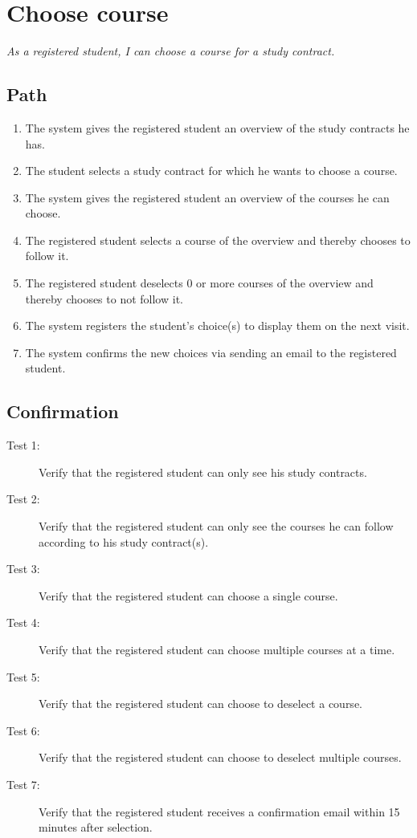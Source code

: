 \section{Choose course}

\par \emph{As a registered student, I can choose a course for a study contract.}

\subsection{Path}

\begin{enumerate}
  \item The system gives the registered student an overview of the study
  contracts he has.
  \item The student selects a study contract for which he wants to choose a
  course.
  \item The system gives the registered student an overview of the courses he
  can choose.
  \item The registered student selects a course of the overview and thereby
  chooses to follow it.
  \item The registered student deselects 0 or more courses of the overview and
  thereby chooses to not follow it.
  \item The system registers the student's choice(s) to display them on the next
  visit.
  \item The system confirms the new choices via sending an email to the
  registered student. 
\end{enumerate}

\subsection{Confirmation}

\begin{description}
\item[Test 1:] Verify that the registered student can only see his study
contracts.
\item[Test 2:] Verify that the registered student can only see the courses he
can follow according to his study contract(s).
\item[Test 3:] Verify that the registered student can choose a single course.
\item[Test 4:] Verify that the registered student can choose multiple courses at
a time.
\item[Test 5:] Verify that the registered student can choose to deselect a
course.
\item[Test 6:] Verify that the registered student can choose to deselect
multiple courses.
\item[Test 7:] Verify that the registered student receives a confirmation email
within 15 minutes after selection.
\end{description}
